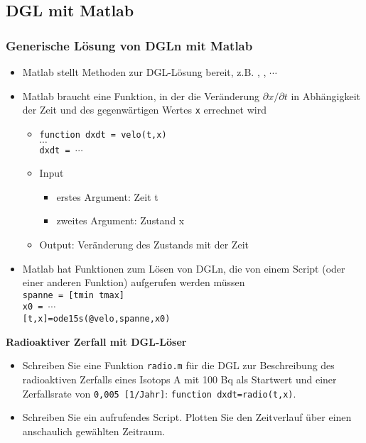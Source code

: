 \subsection{DGL mit Matlab}
  \begin{frame}
      \frametitle{Generische Lösung von DGLn mit Matlab}
      \begin{itemize}
		\item Matlab stellt Methoden zur DGL-Lösung bereit, z.B. , , $\cdots$
        \item Matlab braucht eine Funktion, in der die Veränderung \texttt{$\partial{x}/\partial{t}$} in Abhängigkeit der Zeit und des gegenwärtigen Wertes \texttt{x} errechnet wird
         \begin{itemize}
         	\item \texttt{function dxdt = velo(t,x)}\\
         	 $\cdots$ \\
         	 \texttt{dxdt = $\cdots$} \\
         	\item Input
         	  \begin{itemize}
         	    \item erstes Argument: Zeit t
         	    \item zweites Argument: Zustand x
         	  \end{itemize}
         	\item Output: Veränderung des Zustands mit der Zeit
		 \end{itemize}
        \item Matlab hat Funktionen zum Lösen von DGLn, die von einem Script (oder einer anderen Funktion) aufgerufen werden müssen \\
          \texttt{spanne = [tmin tmax]} \\
          \texttt{x0 = $\cdots$} \\
          \texttt{[t,x]=ode15s(@velo,spanne,x0)} \\
      \end{itemize}
  \end{frame}


  \secMexercise
    \begin{frame}
        \frameMexercise
        \begin{exercise}
            \sloppy
            \textbf{Radioaktiver Zerfall mit DGL-Löser}
            \begin{itemize}
              \item Schreiben Sie eine Funktion \texttt{radio.m} für die DGL zur Beschreibung des radioaktiven Zerfalls eines Isotops A mit 100 Bq als Startwert und einer Zerfallsrate von \texttt{0,005  [1/Jahr]}: \texttt{function dxdt=radio(t,x)}.
              \item Schreiben Sie ein aufrufendes Script. Plotten Sie den Zeitverlauf über einen anschaulich gewählten Zeitraum.
            \end{itemize}
        \end{exercise}
    \end{frame}

